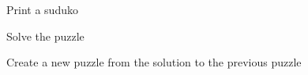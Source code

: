 \documentclass{article}
\begin{document}
Print a suduko
\begin{center}
\end{center}

\newpage
Solve the puzzle
\begin{center}
\end{center}

\newpage
Create a new puzzle from the solution to the previous puzzle
\begin{center}
\generategrid  %
\end{center}
\end{document}
